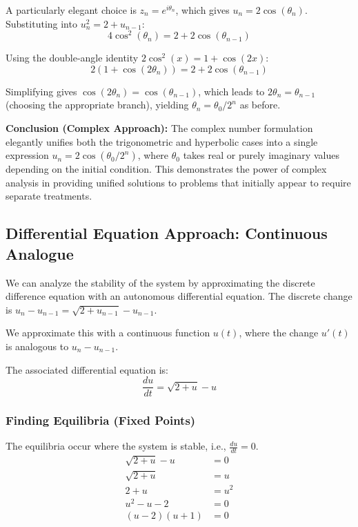 \documentclass[12pt,a4paper]{article}
\theoremstyle{definition}
\begin{document}
A particularly elegant choice is $z_n = e^{i\theta_n}$, which gives $u_n = 2\cos(\theta_n)$. Substituting into $u_n^2 = 2 + u_{n-1}$:
\[
4\cos^2(\theta_n) = 2 + 2\cos(\theta_{n-1})
\]

Using the double-angle identity $2\cos^2(x) = 1 + \cos(2x)$:
\[
2(1 + \cos(2\theta_n)) = 2 + 2\cos(\theta_{n-1})
\]

Simplifying gives $\cos(2\theta_n) = \cos(\theta_{n-1})$, which leads to $2\theta_n = \theta_{n-1}$ (choosing the appropriate branch), yielding $\theta_n = \theta_0/2^n$ as before.

\textbf{Conclusion (Complex Approach):} The complex number formulation elegantly unifies both the trigonometric and hyperbolic cases into a single expression $u_n = 2\cos(\theta_0/2^n)$, where $\theta_0$ takes real or purely imaginary values depending on the initial condition. This demonstrates the power of complex analysis in providing unified solutions to problems that initially appear to require separate treatments.

\subsection{Differential Equation Approach: Continuous Analogue}

We can analyze the stability of the system by approximating the discrete difference equation with an autonomous differential equation. The discrete change is $u_n - u_{n-1} = \sqrt{2 + u_{n-1}} - u_{n-1}$.

We approximate this with a continuous function $u(t)$, where the change $u'(t)$ is analogous to $u_n - u_{n-1}$.

The associated differential equation is:
\begin{equation}
\frac{du}{dt} = \sqrt{2 + u} - u
\end{equation}

\subsubsection{Finding Equilibria (Fixed Points)}

The equilibria occur where the system is stable, i.e., $\frac{du}{dt} = 0$.
\begin{align*}
\sqrt{2 + u} - u &= 0\\
\sqrt{2 + u} &= u\\
2 + u &= u^2\\
u^2 - u - 2 &= 0\\
(u - 2)(u + 1) &= 0
\end{align*}
\end{document}
